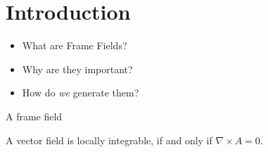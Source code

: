 \documentclass[../thesis.tex]{subfiles}
\begin{document}
\chapter{Introduction}
\label{ch:intro}
\begin{itemize}
  \item What are Frame Fields?
  \item Why are they important?
  \item How do \emph{we} generate them?
\end{itemize}
A frame field 

A vector field is locally integrable, if and only if $\nabla \times A = 0$. \cite{Pap20}
\end{document}
